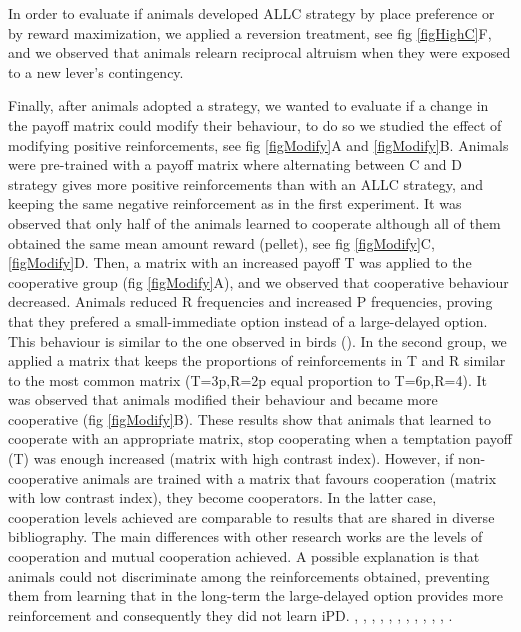 \documentclass[10pt,letterpaper]{article}
\begin{document}
In order to evaluate if animals developed ALLC strategy by place preference or by reward maximization, we applied a reversion treatment, see fig \ref{figHighC}F, and we observed that animals relearn reciprocal altruism when they were exposed to a new lever’s contingency.

Finally, after animals adopted a strategy, we wanted to evaluate if a change in the payoff matrix could modify their behaviour, to do so we studied the effect of modifying positive reinforcements, see fig \ref{figModify}A and \ref{figModify}B. Animals were pre-trained with a payoff matrix where alternating between C and D strategy gives more positive reinforcements than with an ALLC strategy, and keeping the same negative reinforcement as in the first experiment. It was observed that only half of the animals learned to cooperate although all of them obtained the same mean amount reward (pellet), see fig \ref{figModify}C, \ref{figModify}D.
Then, a matrix with an increased payoff T was applied to the cooperative group (fig \ref{figModify}A), and we observed that cooperative behaviour decreased. Animals reduced R frequencies and increased P frequencies, proving that they prefered a small-immediate option instead of a large-delayed option. This behaviour is similar to the one observed in birds (\cite{clements1995testing}). In the second group, we applied a matrix that keeps the proportions of reinforcements in T and R similar to the most common matrix (T=3p,R=2p equal proportion to T=6p,R=4). It was observed that animals modified their behaviour and became more cooperative (fig \ref{figModify}B). These results show that animals that learned to cooperate with an appropriate matrix, stop cooperating when a temptation payoff (T) was enough increased (matrix with high contrast index). However, if non-cooperative animals are trained with a matrix that favours cooperation (matrix with low contrast index), they become cooperators. In the latter case, cooperation levels achieved are comparable to results that are shared in diverse bibliography.                   
The main differences with other research works are the levels of cooperation and mutual cooperation achieved. A possible explanation is that animals could not discriminate among the reinforcements obtained, preventing them from learning that in the long-term the large-delayed option provides more reinforcement and consequently they did not learn iPD. \cite{baker2002teaching}, \cite{clements1995testing}, \cite{
flood19832}, \cite{gardner1984prisoner}, \cite{green1995prisoner}, \cite{marquez2015prosocial}, \cite{mesterton2002economics}, \cite{stephens2001adaptive}, \cite{stephens2006effects}, \cite{ stevens2004economic}, \cite{wood2016cooperation}, \cite{viana2010cognitive}.
\end{document}
